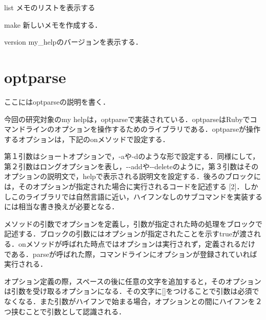 list メモのリストを表示する

make 新しいメモを作成する．

version my\_helpのバージョンを表示する．

\section{optparse}\label{optparse}

ここにはoptparseの説明を書く．

今回の研究対象のmy
helpは，optparseで実装されている．optparseはRubyでコマンドラインのオプションを操作するためのライブラリである．optparseが操作するオプションは，下記のonメソッドで設定する．

\begin{Shaded}
\begin{Highlighting}[]
   
\NormalTok{::}
\NormalTok{    \}}
    
\end{Highlighting}
\end{Shaded}

第１引数はショートオプションで，-aや-dのような形で設定する．同様にして，第２引数はロングオプションを表し，-\/-addや-\/-deleteのように，第３引数はそのオプションの説明文で，helpで表示される説明文を設定する．後ろのブロックには，そのオプションが指定された場合に実行されるコードを記述する
{[}2{]}．しかしこのライブラリでは自然言語に近い，ハイフンなしのサブコマンドを実装するには相当な書き換えが必要となる．

メソッドの引数でオプションを定義し，引数が指定された時の処理をブロックで記述する．ブロックの引数にはオプションが指定されたことを示すtrueが渡される．onメソッドが呼ばれた時点ではオプションは実行されず，定義されるだけである．parseが呼ばれた際，コマンドラインにオプションが登録されていれば実行される．

オプション定義の際，スペースの後に任意の文字を追加すると，そのオプションは引数を受け取るオプションになる．その文字に{[}{]}をつけることで引数は必須でなくなる．また引数がハイフンで始まる場合，オプションとの間にハイフンを２つ挟むことで引数として認識される．

